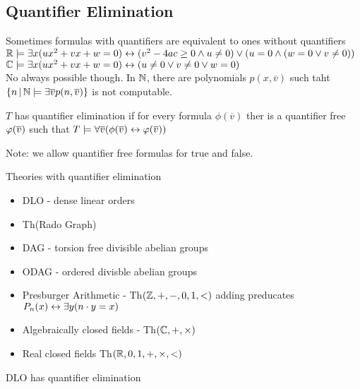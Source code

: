 \subsection{Quantifier Elimination}

Sometimes formulas with quantifiers are equivalent to ones without quantifiers
$\mathbb{R} \models \exists x (ux^2 + vx + w=0) \leftrightarrow (v^2 - 4ac \ge 0 \wedge u \neq 0) \vee (u = 0 \wedge (w=0 \vee v \neq 0))$ \\
$\mathbb{C} \models \exists x (ux^2 + vx + w=0) \leftrightarrow (u \neq 0 \vee v \neq 0 \vee w=0)$ \\

No always possible though. In $\mathbb{N}$, there are polynomials $p(x, \overline{v})$ such taht $\{n \, | \, \mathbb{N} \models \exists \overline{v} p(n, \overline{v})\}$ is not computable. 

\begin{definition}
    $T$ has quantifier elimination if for every formula $\phi(\overline{v})$ ther is a quantifier free $\varphi(\overline{v})$ such that $T \models \forall \overline{v} (\phi(\overline{v}) \leftrightarrow \varphi(\overline{v}))$ 
\end{definition}

\noindent
Note: we allow quantifier free formulas for true and false. \\

\begin{example}
    Theories with quantifier elimination 
    \begin{itemize}
        \item DLO - dense linear orders 
        \item Th(Rado Graph)
        \item DAG - torsion free divisible abelian groups 
        \item ODAG - ordered divisble abelian groups 
        \item Presburger Arithmetic - Th$(\mathbb{Z}, + , - , 0, 1, <)$ adding preducates $P_n(x) \leftrightarrow \exists y(n \cdot y = x)$
        \item Algebraically closed fields - Th$(\mathbb{C}, +, \times)$
        \item Real closed fields Th$(\mathbb{R}, 0, 1, + , \times, < )$ 
    \end{itemize}
\end{example}

\begin{theorem}
    DLO has quantifier elimination
\end{theorem}

